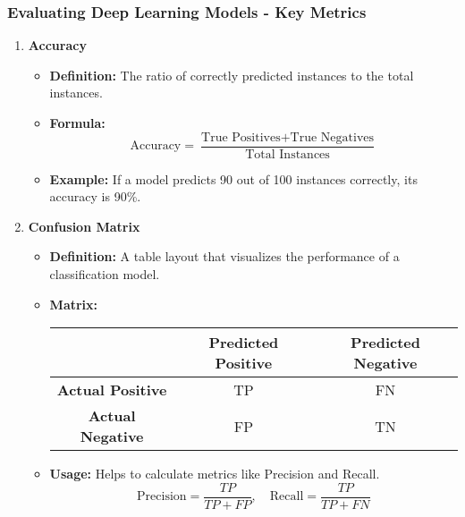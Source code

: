 \documentclass[aspectratio=169]{beamer}
\begin{document}
\begin{frame}[fragile]
    \frametitle{Evaluating Deep Learning Models - Key Metrics}
    \begin{enumerate}
        \item \textbf{Accuracy}
        \begin{itemize}
            \item \textbf{Definition:} The ratio of correctly predicted instances to the total instances.
            \item \textbf{Formula:}
            \begin{equation}
            \text{Accuracy} = \frac{\text{True Positives} + \text{True Negatives}}{\text{Total Instances}}
            \end{equation}
            \item \textbf{Example:} If a model predicts 90 out of 100 instances correctly, its accuracy is 90\%.
        \end{itemize}
        
        \item \textbf{Confusion Matrix}
        \begin{itemize}
            \item \textbf{Definition:} A table layout that visualizes the performance of a classification model.
            \item \textbf{Matrix:}
            \begin{center}
            \begin{tabular}{|c|c|c|}
                \hline
                & \textbf{Predicted Positive} & \textbf{Predicted Negative} \\
                \hline
                \textbf{Actual Positive} & TP & FN \\
                \hline
                \textbf{Actual Negative} & FP & TN \\
                \hline
            \end{tabular}
            \end{center}
            \item \textbf{Usage:} Helps to calculate metrics like Precision and Recall.
            \begin{equation}
            \text{Precision} = \frac{TP}{TP + FP}, \quad \text{Recall} = \frac{TP}{TP + FN}
            \end{equation}
        \end{itemize}
    \end{enumerate}
\end{frame}
\end{document}
